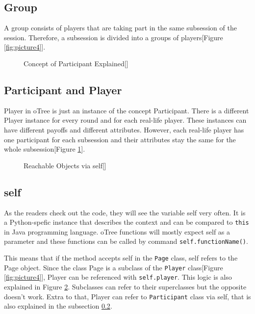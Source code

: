\subsection{Group}

A group consists of players that are taking part in the same subsession of the session. Therefore, a subsession is divided into a groups of players[Figure \ref{fig:picture4}].

\begin{figure}[h]
	\centerline{}
	\caption{Concept of Participant Explained[\cite{oTreeConcepts2017}]}
	\label{fig:picture5}
	
\end{figure}

\subsection{Participant and Player}\label{sub:participant}

Player in oTree is just an instance of the concept Participant. There is a different Player instance for every round and for each real-life player. These instances can have different payoffs and different attributes. However, each real-life player has one participant for each subsession and their attributes stay the same for the whole subsession[Figure \ref{fig:picture5}].

\begin{figure}[h]
	\centerline{}
	\caption{Reachable Objects via self[\cite{oTreeConcepts2017}]}
	\label{fig:picture6}
	
\end{figure}

\subsection{self}

As the readers check out the code, they will see the variable self very often. It is a Python-spefic instance that describes the context and can be compared to \verb|this| in Java programming language. oTree functions will mostly expect self as a parameter and these functions can be called by command \verb|self.functionName()|.

This means that if the method accepts self in the \verb|Page| class, self refers to the Page object. Since the class Page is a subclass of the \verb|Player| class[Figure \ref{fig:picture4}],  Player can be referenced with \verb|self.player|. This logic is also explained in Figure \ref{fig:picture6}. Subclasses can refer to their superclasses but the opposite doesn't work. Extra to that, Player can refer to \verb|Participant| class via self, that is also explained in the subsection \ref{sub:participant}. 

